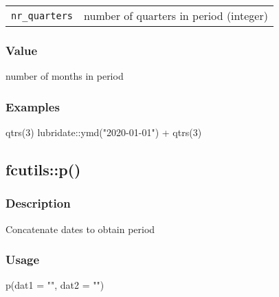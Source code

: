 \documentclass[
  letterpaper,
  DIV=11,
  numbers=noendperiod]{scrreport}
\newenvironment{Shaded}{\begin{snugshade}}{\end{snugshade}}
\newcommand{\AttributeTok}[1]{\textcolor[rgb]{0.40,0.45,0.13}{#1}}
\newcommand{\DecValTok}[1]{\textcolor[rgb]{0.68,0.00,0.00}{#1}}
\newcommand{\FunctionTok}[1]{\textcolor[rgb]{0.28,0.35,0.67}{#1}}
\newcommand{\NormalTok}[1]{\textcolor[rgb]{0.00,0.23,0.31}{#1}}
\newcommand{\SpecialCharTok}[1]{\textcolor[rgb]{0.37,0.37,0.37}{#1}}
\newcommand{\StringTok}[1]{\textcolor[rgb]{0.13,0.47,0.30}{#1}}
\begin{document}
\begin{longtable}[]{@{}ll@{}}
\toprule\noalign{}
\endhead
\bottomrule\noalign{}
\endlastfoot
\texttt{nr\_quarters} & number of quarters in period (integer) \\
\end{longtable}

\subsubsection{Value}\label{value-18}

number of months in period

\subsubsection{Examples}\label{examples-18}

\begin{Shaded}
\begin{Highlighting}[]
\FunctionTok{qtrs}\NormalTok{(}\DecValTok{3}\NormalTok{)}
\NormalTok{lubridate}\SpecialCharTok{::}\FunctionTok{ymd}\NormalTok{(}\StringTok{"2020{-}01{-}01"}\NormalTok{) }\SpecialCharTok{+} \FunctionTok{qtrs}\NormalTok{(}\DecValTok{3}\NormalTok{)}
\end{Highlighting}
\end{Shaded}

\subsection{fcutils::p()}\label{fcutilsp}

\subsubsection{Description}\label{description-19}

Concatenate dates to obtain period

\subsubsection{Usage}\label{usage-19}

\begin{Shaded}
\begin{Highlighting}[]
\FunctionTok{p}\NormalTok{(}\AttributeTok{dat1 =} \StringTok{""}\NormalTok{, }\AttributeTok{dat2 =} \StringTok{""}\NormalTok{)}
\end{Highlighting}
\end{Shaded}
\end{document}
